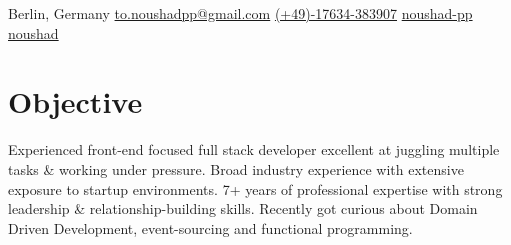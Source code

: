 \documentclass{resume_base}
\begin{document}
	\contact
		{\color{\themeColor} \iconSpace \small {} \color{black}Berlin, Germany}
		{\color{\themeColor} \iconSpace \small {} \href{mailto://to.noushadpp@gmail.com}{to.noushadpp@gmail.com}}
		{\color{\themeColor} \iconSpace \small {}  \href{tel://+4917634383907}{(+49)-17634-383907}}
		{\color{\themeColor} \iconSpace \small {} \href{https://github.com/noushad-pp/}{noushad-pp}}
		{\color{\themeColor} \iconSpace \small {} \href{https://stackoverflow.com/users/5466933/noushad?tab=profile}{noushad}}
	
	\section{Objective}
		\hspace{1pt}\parbox{0.99\textwidth}{
			Experienced front-end focused full stack developer excellent at juggling multiple tasks \& working under pressure. Broad industry experience with extensive exposure to startup environments. 7+ years of professional expertise with strong leadership \& relationship-building skills. Recently got curious about Domain Driven Development, event-sourcing and functional programming.
		}

\end{document}
